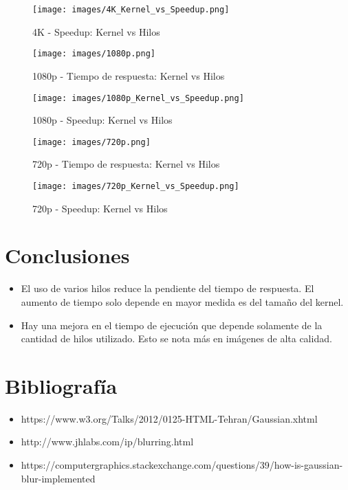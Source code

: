 \documentclass{IEEEtran}
\begin{document}
\begin{figure}[htp]
\centering
\texttt{[image: images/4K\_Kernel\_vs\_Speedup.png]}
\caption{4K - Speedup: Kernel vs Hilos}
\label{4kplot_speedup}
\end{figure}

\begin{figure}[htp]
\centering
\texttt{[image: images/1080p.png]}
\caption{1080p - Tiempo de respuesta: Kernel vs Hilos}
\label{1080pplot_time}
\end{figure}

\begin{figure}[htp]
\centering
\texttt{[image: images/1080p\_Kernel\_vs\_Speedup.png]}
\caption{1080p - Speedup: Kernel vs Hilos}
\label{1080pplot_speedup}
\end{figure}

\begin{figure}[htp]
\centering
\texttt{[image: images/720p.png]}
\caption{720p - Tiempo de respuesta: Kernel vs Hilos}
\label{720pplot_time}
\end{figure}

\begin{figure}[htp]
\centering
\texttt{[image: images/720p\_Kernel\_vs\_Speedup.png]}
\caption{720p - Speedup: Kernel vs Hilos}
\label{720pplot_speedup}
\end{figure}

\section{Conclusiones}
\begin{itemize}
\item El uso de varios hilos reduce la pendiente del tiempo de respuesta. El aumento de tiempo solo depende en mayor medida es del tamaño del kernel.
\item Hay una mejora en el tiempo de ejecución que depende solamente de la cantidad de hilos utilizado. Esto se nota más en imágenes de alta calidad.
\end{itemize}

\noindent 


\section{Bibliografía}
\begin{itemize}
\item https://www.w3.org/Talks/2012/0125-HTML-Tehran/Gaussian.xhtml
\item http://www.jhlabs.com/ip/blurring.html
\item https://computergraphics.stackexchange.com/questions/39/how-is-gaussian-blur-implemented
\end{itemize}

\end{document}
